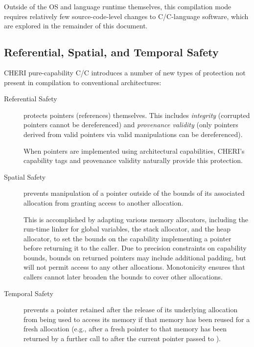 \documentclass[12pt,twoside,openright,usletter]{article}
\newcommand{\ccode}[1]{{\small\ttfamily{#1}}}
\newcommand{\cfunc}[1]{{\ccode{#1()}}}
\newcommand{\note}[2]{{\color{blue}[ Note: #1 - #2]}}
\renewcommand{\note}[2]{\relax\ifhmode\unskip\fi}
\newcommand{\psnote}[1]{\note{#1}{Peter S.}}
\newcommand*{\cpp}[1][]{C\textsmaller[2]{\nolinebreak[4]\hspace{-.05em}\raisebox{.45ex}{\textbf{++}}}}
\newcommand*{\purecapCOrCpp}[1]{CHERI pure-capability C/\cpp{}}
\begin{document}
Outside of the OS and language runtime themselves, this compilation mode
requires relatively few source-code-level changes to C/\cpp{}-language software,
which are explored in the remainder of this document.

\subsection{Referential, Spatial, and Temporal Safety}

\purecapCOrCpp{} introduces a number of new types of protection not
present in compilation to conventional architectures:

\begin{description}
\item[Referential Safety] protects pointers (references) themselves.
  This includes \textit{integrity} (corrupted pointers cannot be dereferenced)
  and \textit{provenance validity} (only pointers derived from valid pointers
  via valid manipulations can be dereferenced).

  When pointers are implemented using architectural capabilities, CHERI's
  capability tags and provenance validity naturally provide this protection.

\item[Spatial Safety] prevents manipulation of a pointer outside of the bounds
  of its associated allocation from granting access to another allocation.

  \psnote{minor wording change for clarity}
  This is accomplished by adapting various memory allocators, including the run-time
  linker for global variables, the stack allocator, and the heap allocator,
  to set the bounds on the capability implementing a pointer before returning
  it to the caller.
  Due to precision constraints on capability bounds, bounds on returned
  pointers may include additional padding, but will not permit access to any
  other allocations.
  Monotonicity ensures that callers cannot later broaden the bounds to cover
  other allocations.

\psnote{this reads as if temporal safety is always on, for heap and stack and everything, and the post-caveat isn't really enough to counteract that.  I'd suggest putting the first part of the post-caveat text here}

\item[Temporal Safety] prevents a pointer retained after the release of its
  underlying allocation from being used to access its memory if that memory
  has been reused for a fresh allocation (e.g., after a fresh pointer to that
  memory has been returned by a further call to \cfunc{malloc} after the
  current pointer passed to \cfunc{free}).


\end{description}
\end{document}
